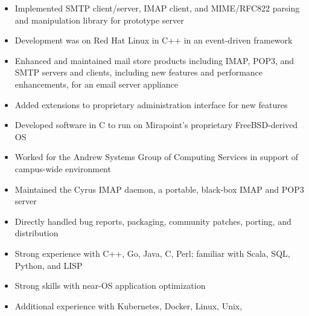 \documentclass[letterpaper,11pt,twoside]{article}
\begin{document}
\vspace{-14pt}
\begin{itemize}
\item Implemented SMTP client/server, IMAP client, and
  MIME/RFC822 parsing and manipulation library for prototype server
\item Development was on Red Hat Linux in C++ in an event-driven framework
\end{itemize}


\vspace{-14pt}
\begin{itemize}
\item Enhanced and maintained mail store products including
  IMAP, POP3, and SMTP servers and clients, including new features
  and performance enhancements, for an email server appliance
\item Added extensions to proprietary administration interface for new
  features
\item Developed software in C to run on Mirapoint’s proprietary
  FreeBSD-derived OS
\end{itemize}

\vspace{-14pt}
\begin{itemize}
\item Worked for the Andrew Systems Group of Computing Services in
  support of campus-wide environment
\item Maintained the Cyrus IMAP daemon, a portable, black-box IMAP and
  POP3 server
\item Directly handled bug reports, packaging, community patches,
  porting, and distribution
\end{itemize}

\vspace{2pt}

\vspace{-6pt}
\begin{itemize}
\item Strong experience with C++, Go, Java, C, Perl; familiar with
  Scala, SQL, Python, and LISP
\item Strong skills with near-OS application optimization
\item Additional experience with Kubernetes, Docker, Linux, Unix, 
\end{itemize}
\end{document}
